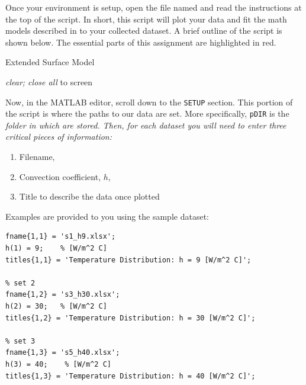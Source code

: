 \documentclass[11pt, letterpaper]{article}
\begin{document}
Once your environment is setup, open the file named  and read the instructions at the top of the script. In short, this script will plot your data and fit the math models described in  to your collected dataset. A brief outline of the script is shown below. The essential parts of this assignment are highlighted in red.
\IncMargin{1em}
\begin{algorithm}[ht]
\caption{Extended Surface Model}

    \emph{clear; close all}\;
    \;
    \;
    \BlankLine
     \;
      to screen\;
\end{algorithm}

\n
\n

Now, in the MATLAB editor, scroll down to the \texttt{SETUP} section. This portion of the script is where the paths to our data are set. More specifically, \texttt{pDIR} is the \it{folder} in which  are stored. Then, for each dataset you will need to enter three critical pieces of information:
\begin{enumerate}
    \item Filename,
    \item Convection coefficient, $h$,
    \item Title to describe the data once plotted
\end{enumerate}

\n
Examples are provided to you using the sample dataset:

\n
\begin{lstlisting}[numbers=none]
% set 1
fname{1,1} = 's1_h9.xlsx';
h(1) = 9;    % [W/m^2 C]
titles{1,1} = 'Temperature Distribution: h = 9 [W/m^2 C]';

% set 2
fname{1,2} = 's3_h30.xlsx';
h(2) = 30;   % [W/m^2 C]
titles{1,2} = 'Temperature Distribution: h = 30 [W/m^2 C]';

% set 3
fname{1,3} = 's5_h40.xlsx';
h(3) = 40;    % [W/m^2 C]
titles{1,3} = 'Temperature Distribution: h = 40 [W/m^2 C]';
\end{lstlisting}
\end{document}
